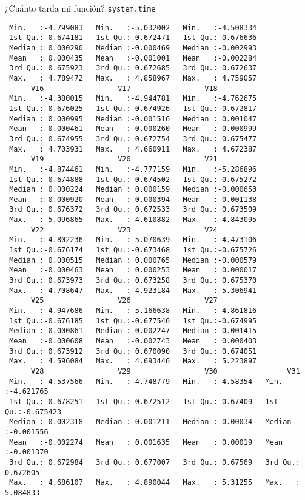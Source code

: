 \documentclass[xcolor={usenames,svgnames,dvipsnames}]{beamer}
\begin{document}
\begin{frame}[label={sec:orga833b1a},fragile]{¿Cuánto tarda mi función? \texttt{system.time}}
\begin{verbatim}
 Min.   :-4.799083   Min.   :-5.032002   Min.   :-4.508334  
 1st Qu.:-0.674181   1st Qu.:-0.672471   1st Qu.:-0.676636  
 Median : 0.000290   Median :-0.000469   Median :-0.002993  
 Mean   : 0.000435   Mean   :-0.001001   Mean   :-0.002284  
 3rd Qu.: 0.675923   3rd Qu.: 0.672685   3rd Qu.: 0.672637  
 Max.   : 4.789472   Max.   : 4.858967   Max.   : 4.759057  
      V16                 V17                 V18           
 Min.   :-4.380015   Min.   :-4.944781   Min.   :-4.762675  
 1st Qu.:-0.676025   1st Qu.:-0.674926   1st Qu.:-0.672817  
 Median : 0.000995   Median :-0.001516   Median : 0.001047  
 Mean   : 0.000461   Mean   :-0.000260   Mean   : 0.000999  
 3rd Qu.: 0.674955   3rd Qu.: 0.672754   3rd Qu.: 0.675477  
 Max.   : 4.703931   Max.   : 4.660911   Max.   : 4.672387  
      V19                 V20                 V21           
 Min.   :-4.874461   Min.   :-4.777159   Min.   :-5.286896  
 1st Qu.:-0.674888   1st Qu.:-0.674502   1st Qu.:-0.675272  
 Median : 0.000224   Median : 0.000159   Median :-0.000653  
 Mean   : 0.000920   Mean   :-0.000394   Mean   :-0.001138  
 3rd Qu.: 0.676372   3rd Qu.: 0.672533   3rd Qu.: 0.673509  
 Max.   : 5.096865   Max.   : 4.610882   Max.   : 4.843095  
      V22                 V23                 V24           
 Min.   :-4.802236   Min.   :-5.070639   Min.   :-4.473106  
 1st Qu.:-0.676174   1st Qu.:-0.673468   1st Qu.:-0.675726  
 Median : 0.000515   Median : 0.000765   Median :-0.000579  
 Mean   :-0.000463   Mean   : 0.000253   Mean   : 0.000017  
 3rd Qu.: 0.673973   3rd Qu.: 0.673258   3rd Qu.: 0.675370  
 Max.   : 4.708647   Max.   : 4.923184   Max.   : 5.306941  
      V25                 V26                 V27           
 Min.   :-4.947686   Min.   :-5.166638   Min.   :-4.861816  
 1st Qu.:-0.676185   1st Qu.:-0.677546   1st Qu.:-0.674995  
 Median :-0.000861   Median :-0.002247   Median : 0.001415  
 Mean   :-0.000608   Mean   :-0.002743   Mean   : 0.000403  
 3rd Qu.: 0.673912   3rd Qu.: 0.670090   3rd Qu.: 0.674051  
 Max.   : 4.596084   Max.   : 4.693446   Max.   : 5.223897  
      V28                 V29                 V30                V31           
 Min.   :-4.537566   Min.   :-4.748779   Min.   :-4.58354   Min.   :-4.621765  
 1st Qu.:-0.678251   1st Qu.:-0.672512   1st Qu.:-0.67409   1st Qu.:-0.675423  
 Median :-0.002318   Median : 0.001211   Median :-0.00034   Median :-0.001556  
 Mean   :-0.002274   Mean   : 0.001635   Mean   : 0.00019   Mean   :-0.001370  
 3rd Qu.: 0.672984   3rd Qu.: 0.677007   3rd Qu.: 0.67569   3rd Qu.: 0.672605  
 Max.   : 4.686107   Max.   : 4.890044   Max.   : 5.31255   Max.   : 5.084833  

\end{verbatim}
\end{frame}
\end{document}
